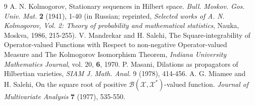 \documentclass[11pt]{article}
\begin{document}
\begin{thebibliography}{9}
 A. N. Kolmogorov, Stationary sequences in Hilbert space.  {\sl Bull. Moskov. Gos. Univ. Mat.} {\bf 2} (1941), 1-40 (in Russian; reprinted, {\sl Selected works of A. N. Kolmogorov, Vol. 2: Theory of probability and mathematical statistics}, Nauka, Moskva, 1986, 215-255).  
 V. Mandrekar and H. Salehi, The Square-integrability of Operator-valued Functions with Respect to non-negative Operator-valued Measure and The Kolmogorov Isomorphism Theorem, {\sl Indiana University Mathematics Journal}, vol. 20, {\bf 6}, 1970.
 P. Masani, Dilations as propagators of Hilbertian varieties, {\sl SIAM J. Math. Anal.} 9 (1978), 414-456.
 A. G. Miamee and H. Salehi, On the square root of positive $\mathcal{B}(\mathcal{X},\mathcal{X}^{*})$-valued function.  {\sl Journal of Multivariate Analysis} {\bf 7} (1977), 535-550.

\end{thebibliography}
\end{document}
